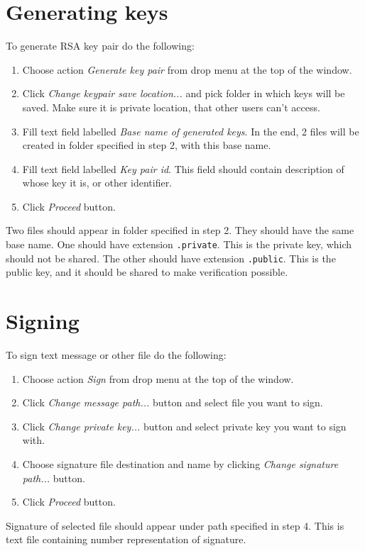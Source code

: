 \documentclass[letterpaper,10pt,english]{sphinxmanual}
\begin{document}
\section{Generating keys}
To generate RSA key pair do the following:
\begin{enumerate}
    \item Choose action {\em Generate key pair} from drop menu at the top of the window.
    \item Click {\em Change keypair save location...} and pick folder in which keys will be saved.
        Make sure it is private location, that other users can't access.
    \item Fill text field labelled {\em Base name of generated keys}. In the end, 2 files
        will be created in folder specified in step 2, with this base name.
    \item Fill text field labelled {\em Key pair id}. This field should contain description
        of whose key it is, or other identifier.
    \item Click {\em Proceed} button.
\end{enumerate}
Two files should appear in folder specified in step 2. They should have the same base name.
One should have extension \verb|.private|. This is the private key, which should not be shared.
The other should have extension \verb|.public|. This is the public key, and it should be shared
to make verification possible.
\section{Signing}
To sign text message or other file do the following:
\begin{enumerate}
    \item Choose action {\em Sign} from drop menu at the top of the window.
    \item Click {\em Change message path...} button and select file you want to sign.
    \item Click {\em Change private key...} button and select private key you want to sign with.
    \item Choose signature file destination and name by clicking {\em Change signature path...} button.
    \item Click {\em Proceed} button.
\end{enumerate}
Signature of selected file should appear under path specified in step 4.
This is text file containing number representation of signature.
\end{document}
